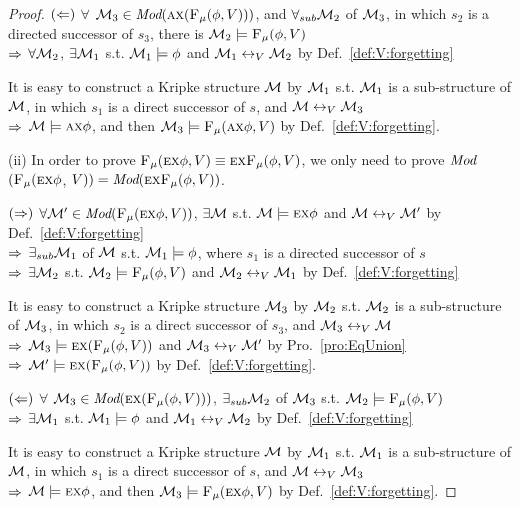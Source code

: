\begin{proof}
	$(\Leftarrow)$ $\forall$ ${\cal M}_3 \in \textit{Mod}(\textsc{a} \textsc{x} ({\textsc{F}_{\textsc{$\mu$}}}(\phi,V)))$, and $\forall_{sub} {\cal M}_2$ of ${\cal M}_3$, in which $s_2$ is a directed successor of $s_3$, there is ${\cal M}_2 \models {\textsc{F}_{\textsc{$\mu$}}}(\phi,V)$\\
	$\Rightarrow$ $\forall {\cal M}_2$, $\exists {\cal M}_1$ s.t. ${\cal M}_1 \models \phi$ and ${\cal M}_1 \leftrightarrow_V {\cal M}_2$ by Def.~\ref{def:V:forgetting}
	
	It is easy to construct a Kripke structure ${\cal M}$ by ${\cal M}_1$ s.t. ${\cal M}_1$ is a sub-structure of ${\cal M}$, in which $s_1$ is a direct successor of $s$, and ${\cal M}\leftrightarrow_V {\cal M}_3$\\
	$\Rightarrow$ ${\cal M} \models \textsc{a} \textsc{x} \phi$, and then ${\cal M}_3 \models {\textsc{F}_{\textsc{$\mu$}}}(\textsc{a} \textsc{x} \phi, V)$  by Def.~\ref{def:V:forgetting}.
	
	
	(ii) In order to prove ${\textsc{F}_{\textsc{$\mu$}}}(\textsc{e} \textsc{x} \phi, V) \equiv \textsc{e}\textsc{x}{\textsc{F}_{\textsc{$\mu$}}}(\phi, V)$, we only need to prove $\textit{Mod}$ $({\textsc{F}_{\textsc{$\mu$}}}(\textsc{e} \textsc{x} \phi$, $V)) = \textit{Mod}( \textsc{e}\textsc{x}{\textsc{F}_{\textsc{$\mu$}}}(\phi, V))$.
	
	$(\Rightarrow)$ $\forall {\cal M}' \in \textit{Mod}({\textsc{F}_{\textsc{$\mu$}}}(\textsc{e} \textsc{x} \phi, V))$, $\exists {\cal M}$ s.t. ${\cal M} \models \textsc{e} \textsc{x} \phi$ and ${\cal M} \leftrightarrow_V {\cal M}'$  by Def.~\ref{def:V:forgetting}\\
	$\Rightarrow$ $\exists_{sub}{\cal M}_1$ of ${\cal M}$ s.t. ${\cal M}_1 \models \phi$, where $s_1$ is a directed successor of $s$\\
	$\Rightarrow$ $\exists {\cal M}_2$ s.t. ${\cal M}_2 \models {\textsc{F}_{\textsc{$\mu$}}}(\phi,V)$ and ${\cal M}_2 \leftrightarrow_V {\cal M}_1$ by Def.~\ref{def:V:forgetting}
	
	It is easy to construct a Kripke structure ${\cal M}_3$ by ${\cal M}_2$ s.t. ${\cal M}_2$ is a sub-structure of ${\cal M}_3$, in which $s_2$ is a direct successor of $s_3$, and ${\cal M}_3 \leftrightarrow_V {\cal M}$\\
	$\Rightarrow$ ${\cal M}_3 \models \textsc{e} \textsc{x} ({\textsc{F}_{\textsc{$\mu$}}}(\phi,V))$ and ${\cal M}_3 \leftrightarrow_V {\cal M}'$ by Pro.~\ref{pro:EqUnion}\\
	$\Rightarrow$ ${\cal M}' \models \textsc{e} \textsc{x} ({\textsc{F}_{\textsc{$\mu$}}}(\phi,V))$  by Def.~\ref{def:V:forgetting}.
	
	$(\Leftarrow)$ $\forall$ ${\cal M}_3 \in \textit{Mod}(\textsc{e} \textsc{x} ({\textsc{F}_{\textsc{$\mu$}}}(\phi,V)))$, $\exists_{sub}{\cal M}_2$ of ${\cal M}_3$ s.t. ${\cal M}_2 \models {\textsc{F}_{\textsc{$\mu$}}}(\phi,V)$\\
	$\Rightarrow$ $\exists{\cal M}_1$ s.t. ${\cal M}_1 \models \phi$ and ${\cal M}_1 \leftrightarrow_V {\cal M}_2$ by Def.~\ref{def:V:forgetting}
	
	It is easy to construct a Kripke structure ${\cal M}$ by ${\cal M}_1$ s.t. ${\cal M}_1$ is a sub-structure of ${\cal M}$, in which $s_1$ is a direct successor of $s$, and ${\cal M}\leftrightarrow_V {\cal M}_3$\\
	$\Rightarrow$ ${\cal M} \models \textsc{e} \textsc{x} \phi$, and then ${\cal M}_3 \models {\textsc{F}_{\textsc{$\mu$}}}(\textsc{e} \textsc{x} \phi, V)$  by Def.~\ref{def:V:forgetting}.
	
\end{proof}

